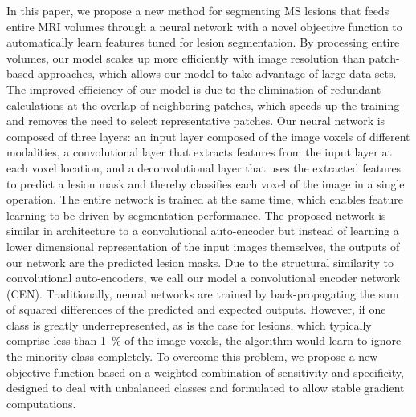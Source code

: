 In this paper, we propose a new method for segmenting MS lesions that feeds
entire MRI volumes through a neural network with a novel objective function to
automatically learn features tuned for lesion segmentation. By processing entire
volumes, our model scales up more efficiently with image resolution than
patch-based approaches, which allows our model to take advantage of large data
sets. The improved efficiency of our model is due to the elimination of
redundant calculations at the overlap of neighboring patches, which speeds up
the training and removes the need to select representative patches. Our neural
network is composed of three layers: an input layer composed of the image voxels
of different modalities, a convolutional layer \cite{LeCun1998} that extracts
features from the input layer at each voxel location, and a deconvolutional
layer \cite{zeiler2011} that uses the extracted features to predict
a lesion mask and thereby classifies each voxel of the image in a single
operation. The entire network is trained at the same time, which enables feature
learning to be driven by segmentation performance. The proposed network is
similar in architecture to a convolutional auto-encoder \cite{masci2011} but
instead of learning a lower dimensional representation of the input images
themselves, the outputs of our network are the predicted lesion masks. Due to
the structural similarity to convolutional auto-encoders, we call our model a
convolutional encoder network (CEN). Traditionally, neural networks are trained
by back-propagating the sum of squared differences of the predicted and
expected outputs. However, if one class is greatly underrepresented, as is the
case for lesions, which typically comprise less than \SI{1}{\percent} of the
image voxels, the algorithm would learn to ignore the minority class completely.
To overcome this problem, we propose a new objective function based on a
weighted combination of sensitivity and specificity, designed to deal with
unbalanced classes and formulated to allow stable gradient computations.

% 
% 
% 
% 
% 
% 
% 
